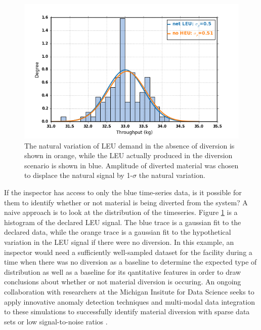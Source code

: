 \begin{figure}
\begin{center}
\includegraphics[natwidth=162bp,natheight=227bp, scale=0.7]{./figs/netLEU_hist_R5_new.png}
\end{center}
\caption{The natural variation of \gls{LEU} demand in the absence of diversion is shown in orange, while the \gls{LEU} actually produced in the diversion scenario is shown in blue. Amplitude of diverted material was chosen to displace the natural signal by 1-$\sigma$ the natural variation.}
\label{fig:leu_histogram}
\end{figure}

If the inspector has access to only the blue time-series data, is it possible for them to identify whether or not material is being diverted from the system?  A naive approach is to look at the distribution of the timeseries.  Figure \ref{fig:leu_histogram} is a histogram of the declared \gls{LEU} signal.  The blue trace is a gaussian fit to the declared data, while the orange trace is a gaussian fit to the hypothetical variation in the \gls{LEU} signal if there were no diversion.  In this example, an inspector would need a sufficiently well-sampled dataset for the facility during a time when there was no diversion as a baseline to determine the expected type of distribution as well as a baseline for its qantitative features in order to draw conclusions about whether or not material diversion is occuring. An ongoing collaboration with researchers at the Michigan Insitute for Data Science seeks to apply innovative anomaly detection techniques and multi-modal data integration to these simulations to successfully identify material diversion with sparse data sets or low signal-to-noise ratios \cite{HERO_research}.






  